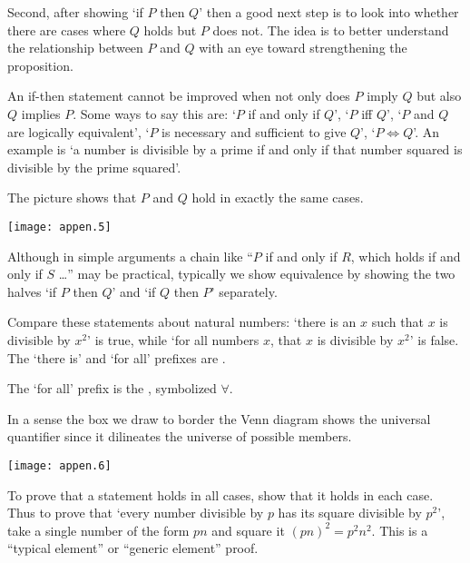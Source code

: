 Second,
after showing `if \( P \) then \( Q \)' then a good next step is to look into
whether there are cases where \( Q \) holds but \( P \) does not.
The idea is to better understand the relationship between \( P \) and
\( Q \) with an eye toward strengthening the proposition.



An if-then statement
cannot be improved when not only does \( P \) imply \( Q \) but
also \( Q \) implies \( P \). 
Some ways to say this are:
`\( P \) if and only if
\( Q \)', `\( P \) iff \( Q \)', `\( P \) and \( Q \) are logically
equivalent', `\( P \) is necessary and sufficient to give \( Q \)',
`\( P\iff Q \)'.
An example is `a number is divisible by a prime if and only if that number
squared is divisible by the prime squared'.

The picture shows that \( P \) and \( Q \) hold in exactly the
same cases.
\begin{center}
  \texttt{[image: appen.5]}
\end{center}
Although in simple arguments a chain like 
``\( P \) if and only if $R$, which holds if and only if $S$ \ldots''
may be practical, typically we show equivalence by showing the two halves
`if \( P \) then \( Q \)' and `if \( Q \) then \( P \)' separately.








Compare these statements about natural numbers:
`there is an \( x \) such that \( x \) is
divisible by \( x^2 \)' is true, while
`for all numbers \( x \), that \( x \) is divisible by \( x^2 \)' is false.
The `there is' and `for all' 
prefixes are .

The `for all' prefix is the 
, 
symbolized \( \forall \).

In a sense the
box we draw to border the Venn diagram shows the universal quantifier since
it dilineates the universe of possible members.
\begin{center}
  \texttt{[image: appen.6]}
\end{center}

To prove that a statement holds in all cases, 
show that it holds in each case.
Thus to prove that `every number divisible by \( p \) has its
square divisible by \( p^2 \)', take a single number of the form
\( pn \) and square it \( (pn)^2=p^2n^2 \).
This is a ``typical element'' or ``generic element'' proof.

